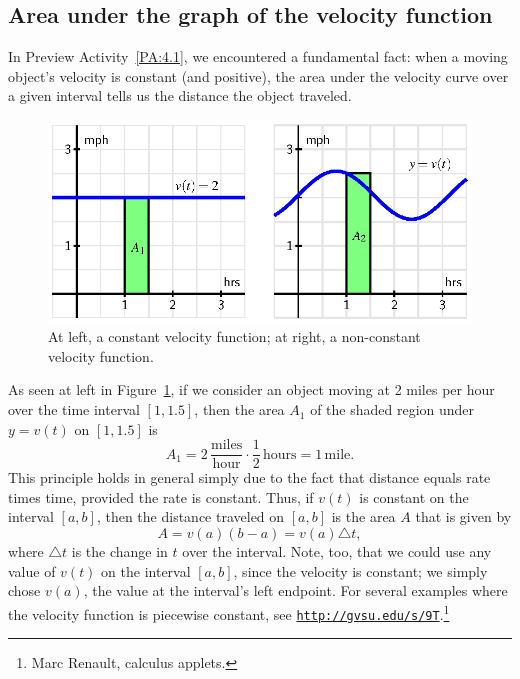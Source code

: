 \subsection*{Area under the graph of the velocity function}

In Preview Activity~\ref{PA:4.1}, we encountered a fundamental fact:  when a moving object's velocity is constant (and positive), the area under the velocity curve over a given interval tells us the distance the object traveled.   
\begin{figure}[h]
\begin{center}
\includegraphics{figures/4_1_VelArea.eps}
\caption{At left, a constant velocity function; at right, a non-constant velocity function.} \label{F:4.1.VelArea}
\end{center}
\end{figure}
As seen at left in Figure~\ref{F:4.1.VelArea}, if we consider an object moving at 2 miles per hour over the time interval $[1,1.5]$, then the area $A_1$ of the shaded region under $y = v(t)$ on $[1,1.5]$ is
$$A _1= 2 \, \frac{\mbox{miles}}{\mbox{hour}} \cdot \frac{1}{2} \, \mbox{hours} = 1 \, \mbox{mile}.$$
This principle holds in general simply due to the fact that distance equals rate times time, provided the rate is constant.  Thus, if $v(t)$ is constant on the interval $[a,b]$, then the distance traveled on $[a,b]$ is the area $A$ that is given by 
$$A = v(a) (b-a) = v(a) \triangle t,$$
where $\triangle t$ is the change in $t$ over the interval.  Note, too, that we could use any value of $v(t)$ on the interval $[a,b]$, since the velocity is constant; we simply chose $v(a)$, the value at the interval's left endpoint.  For several examples where the velocity function is piecewise constant, see \href{http://gvsu.edu/s/9T}{\texttt{http://gvsu.edu/s/9T}}.\footnote{Marc Renault, calculus applets.}	

